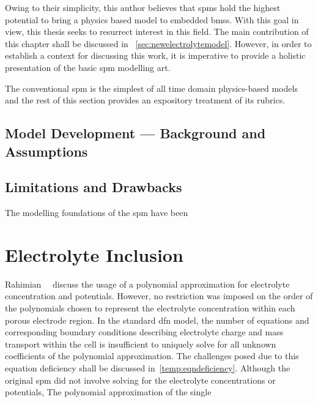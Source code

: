 Owing  to  their simplicity,  this  author  believes  that \gls{spm}s  hold  the
highest  potential  to bring  a  physics  based  model to  embedded  \gls{bms}s.
With  this   goal  in  view,  this   thesis  seeks  to  resurrect   interest  in
this  field.  The main  contribution  of  this  chapter  shall be  discussed  in
~\cref{sec:newelectrolytemodel}. However,  in order  to establish a  context for
discussing this work, it is imperative to provide a holistic presentation of the
basic \gls{spm} modelling art.


The  conventional \gls{spm}  is the  simplest of  all time  domain physics-based
models and  the rest  of this  section provides an  expository treatment  of its
rubrics.



\subsection{Model Development --- Background and Assumptions}

\subsection{Limitations and Drawbacks}\label{subsec:basicspmlimitations}

The modelling foundations of the \gls{spm} have been






\section{Electrolyte Inclusion}\label{sec:electrolyteinclusion}

Rahimian~\etal{}~\cite{KhaleghiRahimian2013}  discuss  the  usage  of  a
polynomial approximation for electrolyte  concentration and potentials. However,
no restriction was  imposed on the order of the  polynomials chosen to represent
the  electrolyte  concentration within  each  porous  electrode region.  In  the
standard \gls{dfn}  model, the  number of  equations and  corresponding boundary
conditions describing electrolyte  charge and mass transport within  the cell is
insufficient to  uniquely solve for  all unknown coefficients of  the polynomial
approximation.  The  challenges posed  due  to  this equation  deficiency  shall
be  discussed  in~\cref{temp:eqndeficiency}.
Although  the original  \gls{spm} did  not involve  solving for  the electrolyte
concentrations or potentials, The polynomial approximation of the single


